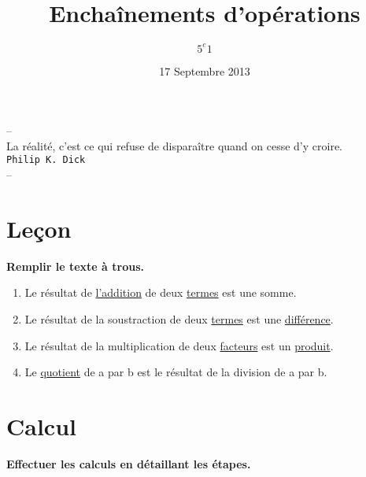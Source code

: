 \documentclass[11pt]{article}
\title{Enchaînements d'opérations} %
\author{$5^e 1$}
\date{17 Septembre 2013} %
\begin{document}
\maketitle %

\begin{center}
  \textsf{--}\\
  \textsf{La réalité, c'est ce qui refuse de disparaître quand on cesse d'y croire.}\\
  \texttt{Philip K. Dick}\\
  \textsf{--}
\end{center}

\thispagestyle{empty}

\section{Leçon}
\textbf{Remplir le texte à trous.}

\begin{enumerate}
\item Le résultat de \underline{l'addition} de deux \underline{termes} est une somme.\\
\item Le résultat de la soustraction de deux \underline{termes} est une \underline{différence}.\\
\item Le résultat de la multiplication de deux \underline{facteurs} est un \underline{produit}.\\
\item Le \underline{quotient} de a par b est le résultat de la division de a par b.
\end{enumerate}


\vspace{1cm}
\section{Calcul}
\textbf{Effectuer les calculs en détaillant les étapes.}
\end{document}
